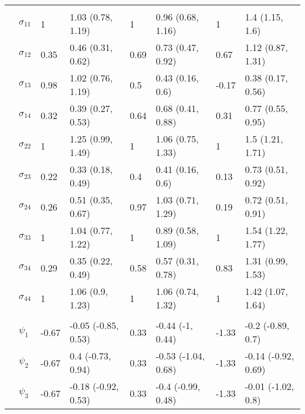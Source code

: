 \documentclass[]{article}
\begin{document}
\begin{table}[t]
\begin{tabular}{llllllll}
\addlinespace[0.3em]
\multicolumn{8}{l}{\textbf{ }}\\
\hspace{1em} & $\sigma_{11}$ & 1 & 1.03 (0.78, 1.19) & 1 & 0.96 (0.68, 1.16) & 1 & 1.4 (1.15, 1.6)\\
\hspace{1em} & $\sigma_{12}$ & 0.35 & 0.46 (0.31, 0.62) & 0.69 & 0.73 (0.47, 0.92) & 0.67 & 1.12 (0.87, 1.31)\\
\hspace{1em} & $\sigma_{13}$ & 0.98 & 1.02 (0.76, 1.19) & 0.5 & 0.43 (0.16, 0.6) & -0.17 & 0.38 (0.17, 0.56)\\
\hspace{1em} & $\sigma_{14}$ & 0.32 & 0.39 (0.27, 0.53) & 0.64 & 0.68 (0.41, 0.88) & 0.31 & 0.77 (0.55, 0.95)\\
\hspace{1em} & $\sigma_{22}$ & 1 & 1.25 (0.99, 1.49) & 1 & 1.06 (0.75, 1.33) & 1 & 1.5 (1.21, 1.71)\\
\hspace{1em} & $\sigma_{23}$ & 0.22 & 0.33 (0.18, 0.49) & 0.4 & 0.41 (0.16, 0.6) & 0.13 & 0.73 (0.51, 0.92)\\
\hspace{1em} & $\sigma_{24}$ & 0.26 & 0.51 (0.35, 0.67) & 0.97 & 1.03 (0.71, 1.29) & 0.19 & 0.72 (0.51, 0.91)\\
\hspace{1em} & $\sigma_{33}$ & 1 & 1.04 (0.77, 1.22) & 1 & 0.89 (0.58, 1.09) & 1 & 1.54 (1.22, 1.77)\\
\hspace{1em} & $\sigma_{34}$ & 0.29 & 0.35 (0.22, 0.49) & 0.58 & 0.57 (0.31, 0.78) & 0.83 & 1.31 (0.99, 1.53)\\
\hspace{1em} & $\sigma_{44}$ & 1 & 1.06 (0.9, 1.23) & 1 & 1.06 (0.74, 1.32) & 1 & 1.42 (1.07, 1.64)\\
\addlinespace[0.3em]
\multicolumn{8}{l}{\textbf{ }}\\
\hspace{1em} & $\psi_{1}$ & -0.67 & -0.05 (-0.85, 0.53) & 0.33 & -0.44 (-1, 0.44) & -1.33 & -0.2 (-0.89, 0.7)\\
\hspace{1em} & $\psi_{2}$ & -0.67 & 0.4 (-0.73, 0.94) & 0.33 & -0.53 (-1.04, 0.68) & -1.33 & -0.14 (-0.92, 0.69)\\
\hspace{1em} & $\psi_{3}$ & -0.67 & -0.18 (-0.92, 0.53) & 0.33 & -0.4 (-0.99, 0.48) & -1.33 & -0.01 (-1.02, 0.8)\\

\end{tabular}
\end{table}
\end{document}
